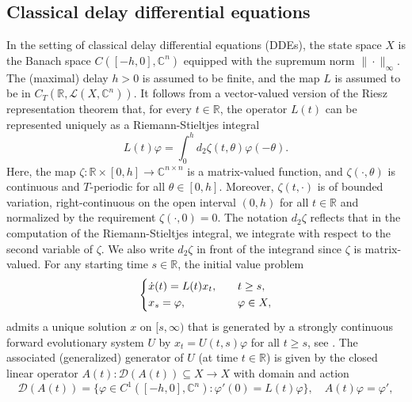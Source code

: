 \documentclass[english]{myarticle}
\begin{document}
\begin{sloppypar}
\subsection{Classical delay differential equations} \label{subsec:classicalDDEs}
In the setting of classical delay differential equations (DDEs),
the state space $X$ is the Banach space $C([-h,0],\mathbb{C}^n)$ equipped with the supremum norm $\| \cdot \|_{\infty}$. The (maximal) delay $h > 0$ is assumed to be finite, and the map $L$ is assumed to be in $C_T(\mathbb{R},\mathcal{L}(X,\mathbb{C}^n))$. It follows from a vector-valued version of the Riesz representation theorem that, for every $t \in \mathbb{R}$, the operator $L(t)$ can be represented uniquely as a Riemann-Stieltjes integral
\begin{equation} \label{eq:L(t)RieszDDE}
    L(t)\varphi = \int_0^h d_2 \zeta(t,\theta) \varphi(-\theta).
\end{equation}
Here, the map $\zeta : \mathbb{R} \times [0,h] \to \mathbb{C}^{n \times n}$ is a matrix-valued function, and $\zeta(\cdot,\theta)$ is continuous and $T$-periodic for all $\theta \in [0,h]$. Moreover, $\zeta(t,\cdot)$ is of bounded variation, right-continuous on the open interval $(0,h)$ for all $t \in \mathbb{R}$ and normalized by the requirement $\zeta(\cdot,0) = 0$. The notation $d_2 \zeta$ reflects that in the computation of the Riemann-Stieltjes integral, we integrate with respect to the second variable of $\zeta$. We also write $d_2 \zeta$ in front of the integrand since $\zeta$ is matrix-valued. For any starting time $s \in \mathbb{R}$, the initial value problem
\begin{equation} \label{eq:LinearDDE}
    \begin{dcases}
    \dot{x}(t) = L(t)x_t, \quad &t \geq s, \\
    x_s = \varphi, \quad &\varphi \in X,    
    \end{dcases}
\end{equation}
admits a unique solution $x$ on $[s,\infty)$ that is generated by a strongly continuous forward evolutionary system $U$ by $x_t = U(t,s)\varphi$ for all $t \geq s$, see \cite[Theorem XII.2.7 and XII.3.1]{Diekmann1995}. The associated (generalized) generator of $U$ (at time $t \in \mathbb{R}$) is given by the closed linear operator $A(t) : \mathcal{D}(A(t)) \subseteq X \to X$ with domain and action
\begin{equation*}
    \mathcal{D}(A(t)) = \{ \varphi \in C^{1}([-h,0],\mathbb{C}^n) : \varphi '(0) = L(t) \varphi \}, \quad A(t)\varphi = \varphi',

\end{equation*}
\end{sloppypar}
\end{document}
